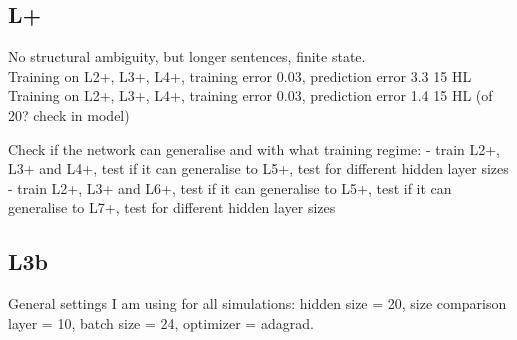 \documentclass{article}
\begin{document}
\subsection{L+}

No structural ambiguity, but longer sentences, finite state.\\

Training on L2+, L3+, L4+, training error 0.03, prediction error 3.3 15 HL
Training on L2+, L3+, L4+, training error 0.03, prediction error 1.4 15 HL (of 20? check in model)

Check if the network can generalise and with what training regime:
- train L2+, L3+ and L4+, test if it can generalise to L5+, test for different hidden layer sizes
- train L2+, L3+ and L6+, test if it can generalise to L5+, test if it can generalise to L7+, test for different hidden layer sizes

\subsection{L3b}

General settings I am using for all simulations: hidden size = 20, size comparison layer = 10, batch size = 24, optimizer = adagrad.
\end{document}
